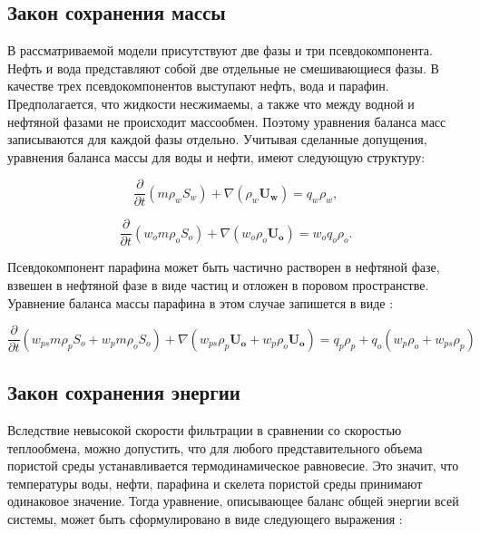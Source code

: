\documentclass[a4paper,12pt]{article}
\begin{document}
\vspace{2em}
{\subsection*{\normalsize Закон сохранения массы}}
	В рассматриваемой модели присутствуют две фазы и три псевдокомпонента. Нефть и вода представляют собой две отдельные не смешивающиеся фазы. В качестве трех псевдокомпонентов выступают нефть, вода и парафин. Предполагается, что жидкости несжимаемы, а также что между водной и нефтяной фазами не происходит массообмен. Поэтому уравнения баланса масс записываются для каждой фазы отдельно. Учитывая сделанные допущения, уравнения баланса массы для воды и нефти, имеют следующую структуру:

\begin{equation}\label{eq1}
\frac{\partial }{\partial t}(m \rho_w S_w ) + \nabla(\rho_w \mathbf{U_w}) = q_w \rho_w,
\end{equation}

\begin{equation}\label{eq2}
\frac{\partial }{\partial t}(w_o  m \rho_o S_o) + \nabla(w_o \rho_o \mathbf{U_o}) = w_o q_o \rho_o.
\end{equation}

Псевдокомпонент парафина может быть частично растворен в нефтяной фазе, взвешен в нефтяной фазе в виде частиц и отложен в поровом пространстве. Уравнение баланса массы парафина в этом случае запишется в виде \cite{bib:02}:

\begin{equation}\label{eq3}
\frac{\partial}{\partial t}(w_{ps} m \rho_p S_o + w_p  m \rho_o S_o) + \nabla(w_{ps}  \rho_p \mathbf{U_o} + w_p \rho_o \mathbf{U_o}) = q_p \rho_p + q_o (w_p \rho_o + w_{ps} \rho_p)
\end{equation}

\vspace{2em}
{\subsection*{\normalsize Закон сохранения энергии}}
	Вследствие невысокой скорости фильтрации в сравнении со скоростью теплообмена, можно допустить, что для любого представительного объема пористой среды устанавливается термодинамическое равновесие. Это значит, что температуры воды, нефти, парафина и скелета пористой среды принимают одинаковое значение. Тогда  уравнение, описывающее баланс общей энергии всей системы, может быть сформулировано в виде следующего выражения \cite{bib:03}:
\end{document}
